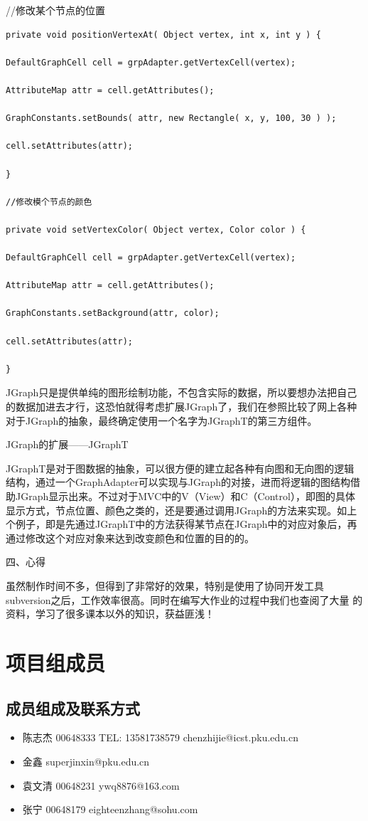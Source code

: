 \documentclass[a4paper,unicode=true,xetex]{article}
\begin{document}
//修改某个节点的位置
\begin{lstlisting}
private void positionVertexAt( Object vertex, int x, int y ) {

DefaultGraphCell cell = grpAdapter.getVertexCell(vertex);

AttributeMap attr = cell.getAttributes();

GraphConstants.setBounds( attr, new Rectangle( x, y, 100, 30 ) );

cell.setAttributes(attr);

}

//修改模个节点的颜色

private void setVertexColor( Object vertex, Color color ) {

DefaultGraphCell cell = grpAdapter.getVertexCell(vertex);

AttributeMap attr = cell.getAttributes();

GraphConstants.setBackground(attr, color);

cell.setAttributes(attr);

}
\end{lstlisting}
JGraph只是提供单纯的图形绘制功能，不包含实际的数据，所以要想办法把自己的数据加进去才行，这恐怕就得考虑扩展JGraph了，我们在参照比较了网上各种对于JGraph的抽象，最终确定使用一个名字为JGraphT的第三方组件。

JGraph的扩展——JGraphT

JGraphT是对于图数据的抽象，可以很方便的建立起各种有向图和无向图的逻辑结构，通过一个GraphAdapter可以实现与JGraph的对接，进而将逻辑的图结构借助JGraph显示出来。不过对于MVC中的V（View）和C（Control），即图的具体显示方式，节点位置、颜色之类的，还是要通过调用JGraph的方法来实现。如上个例子，即是先通过JGraphT中的方法获得某节点在JGraph中的对应对象后，再通过修改这个对应对象来达到改变颜色和位置的目的的。

四、心得

虽然制作时间不多，但得到了非常好的效果，特别是使用了协同开发工具%
subversion之后，工作效率很高。同时在编写大作业的过程中我们也查阅了大量%
的资料，学习了很多课本以外的知识，获益匪浅！


\section{项目组成员}

\subsection{成员组成及联系方式}
\begin{itemize}
\item 陈志杰 00648333 TEL: 13581738579  chenzhijie@icst.pku.edu.cn
\item 金鑫 superjinxin@pku.edu.cn
\item 袁文清 00648231 ywq8876@163.com
\item 张宁 00648179 eighteenzhang@sohu.com
\end{itemize}
\end{document}
